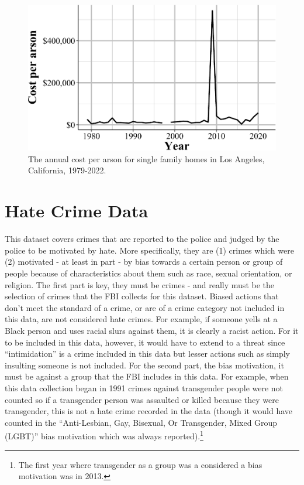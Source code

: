 \documentclass[
  12pt,
  openany]{book}
\begin{document}
\begin{figure}

{\centering \includegraphics[width=0.9\linewidth]{08_arson_files/figure-latex/arsonCost-1} 

}

\caption{The annual cost per arson for single family homes in Los Angeles, California, 1979-2022.}\label{fig:arsonCost}
\end{figure}

\chapter{Hate Crime Data}\label{hate_crimes}

This dataset covers crimes that are reported to the police and judged by the police to be motivated by hate. More specifically, they are (1) crimes which were (2) motivated - at least in part - by bias towards a certain person or group of people because of characteristics about them such as race, sexual orientation, or religion. The first part is key, they must be crimes - and really must be the selection of crimes that the FBI collects for this dataset. Biased actions that don't meet the standard of a crime, or are of a crime category not included in this data, are not considered hate crimes. For example, if someone yells at a Black person and uses racial slurs against them, it is clearly a racist action. For it to be included in this data, however, it would have to extend to a threat since ``intimidation'' is a crime included in this data but lesser actions such as simply insulting someone is not included. For the second part, the bias motivation, it must be against a group that the FBI includes in this data. For example, when this data collection began in 1991 crimes against transgender people were not counted so if a transgender person was assaulted or killed because they were transgender, this is not a hate crime recorded in the data (though it would have counted in the ``Anti-Lesbian, Gay, Bisexual, Or Transgender, Mixed Group (LGBT)'' bias motivation which was always reported).\footnote{The first year where transgender as a group was a considered a bias motivation was in 2013.}
\end{document}
